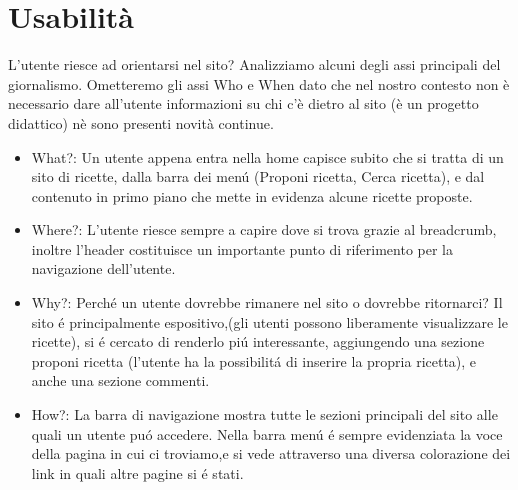 \documentclass[12pt]{article}
\begin{document}
			\section{Usabilit\`a}
			L'utente riesce ad orientarsi nel sito? Analizziamo alcuni degli assi principali del giornalismo. Ometteremo gli assi Who e When dato che nel nostro contesto non \`e necessario dare all'utente informazioni su chi c'\`e dietro al sito (\`e un progetto didattico) n\`e sono presenti novità continue.
			\begin{itemize}
				
				\item What?: 
				Un utente appena entra nella home capisce subito che si tratta di un sito di ricette, dalla barra dei men\'u (Proponi ricetta, Cerca ricetta), e dal contenuto in primo piano che mette in evidenza alcune ricette proposte.
				
				\item Where?: 
				L'utente riesce sempre a capire dove si trova grazie al breadcrumb, inoltre l'header costituisce un importante punto di riferimento per la navigazione dell'utente.
				
				\item Why?: 
				Perch\'e un utente dovrebbe rimanere nel sito o dovrebbe ritornarci? Il sito \'e principalmente espositivo,(gli utenti possono liberamente visualizzare le ricette), si \'e cercato di renderlo pi\'u interessante, aggiungendo una sezione proponi ricetta (l'utente ha la possibilit\'a di inserire la propria ricetta), e anche una sezione commenti.
				
				\item How?:
				 La barra di navigazione mostra tutte le sezioni principali del sito alle quali un utente pu\'o accedere.
				Nella barra men\'u \'e sempre evidenziata la voce della pagina in cui ci troviamo,e si vede attraverso una diversa colorazione dei link in quali altre pagine si \'e stati. 

				
			\end{itemize}
	
	
\end{document}
